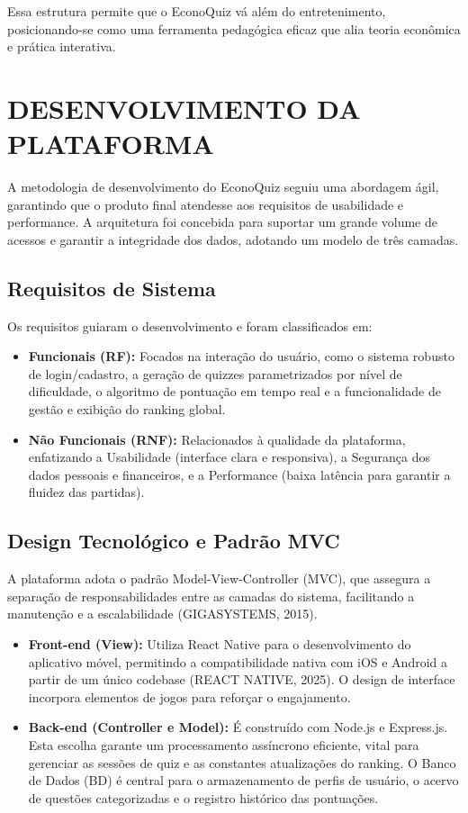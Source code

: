 \documentclass[12pt,a4paper]{article}
\begin{document}
Essa estrutura permite que o EconoQuiz vá além do entretenimento, posicionando-se como uma ferramenta pedagógica eficaz que alia teoria econômica e prática interativa.

\section{DESENVOLVIMENTO DA PLATAFORMA}

A metodologia de desenvolvimento do EconoQuiz seguiu uma abordagem ágil, garantindo que o produto final atendesse aos requisitos de usabilidade e performance. A arquitetura foi concebida para suportar um grande volume de acessos e garantir a integridade dos dados, adotando um modelo de três camadas.

\subsection{Requisitos de Sistema}

Os requisitos guiaram o desenvolvimento e foram classificados em:

\begin{itemize}
    \item \textbf{Funcionais (RF):} Focados na interação do usuário, como o sistema robusto de login/cadastro, a geração de quizzes parametrizados por nível de dificuldade, o algoritmo de pontuação em tempo real e a funcionalidade de gestão e exibição do ranking global.
    \item \textbf{Não Funcionais (RNF):} Relacionados à qualidade da plataforma, enfatizando a Usabilidade (interface clara e responsiva), a Segurança dos dados pessoais e financeiros, e a Performance (baixa latência para garantir a fluidez das partidas).
\end{itemize}

\subsection{Design Tecnológico e Padrão MVC}

A plataforma adota o padrão Model-View-Controller (MVC), que assegura a separação de responsabilidades entre as camadas do sistema, facilitando a manutenção e a escalabilidade (GIGASYSTEMS, 2015).

\begin{itemize}
    \item \textbf{Front-end (View):} Utiliza React Native para o desenvolvimento do aplicativo móvel, permitindo a compatibilidade nativa com iOS e Android a partir de um único codebase (REACT NATIVE, 2025). O design de interface incorpora elementos de jogos para reforçar o engajamento.
    \item \textbf{Back-end (Controller e Model):} É construído com Node.js e Express.js. Esta escolha garante um processamento assíncrono eficiente, vital para gerenciar as sessões de quiz e as constantes atualizações do ranking. O Banco de Dados (BD) é central para o armazenamento de perfis de usuário, o acervo de questões categorizadas e o registro histórico das pontuações.
\end{itemize}
\end{document}
